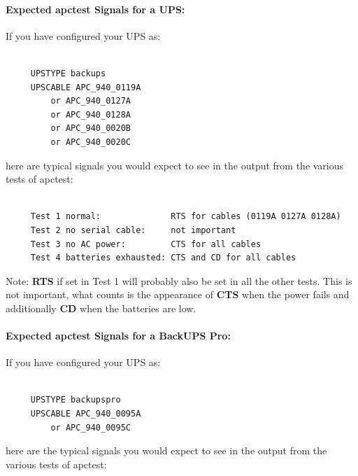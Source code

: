 {{{{{{{{{{\label{Expected-apctest-Signals-for-a-UPS}

\paragraph*{Expected apctest Signals for a UPS:}

\label{index-Testing-224}
\label{index-apctest-225}
If you have configured your UPS as: 

\footnotesize
\begin{verbatim}
     
     UPSTYPE backups
     UPSCABLE APC_940_0119A
         or APC_940_0127A
         or APC_940_0128A
         or APC_940_0020B
         or APC_940_0020C
\end{verbatim}
\normalsize

here are typical signals you would expect to see in the output from the
various tests of apctest: 

\footnotesize
\begin{verbatim}
     
     Test 1 normal:              RTS for cables (0119A 0127A 0128A)
     Test 2 no serial cable:     not important
     Test 3 no AC power:         CTS for all cables
     Test 4 batteries exhausted: CTS and CD for all cables
\end{verbatim}
\normalsize

Note: {\bf RTS} if set in Test 1 will probably also be set in all the other
tests. This is not important, what counts is the appearance of {\bf CTS} when
the power fails and additionally {\bf CD} when the batteries are low. 

\label{Expected-apctest-Signals-for-a-BackUPS-Pro}

\paragraph*{Expected apctest Signals for a BackUPS Pro:}

\label{index-Testing-226}
\label{index-apctest-227}
If you have configured your UPS as: 

\footnotesize
\begin{verbatim}
     
     UPSTYPE backupspro
     UPSCABLE APC_940_0095A
         or APC_940_0095C
\end{verbatim}
\normalsize

here are the typical signals you would expect to see in the output from the
various tests of apctest: 

}}}}}}}}}}
